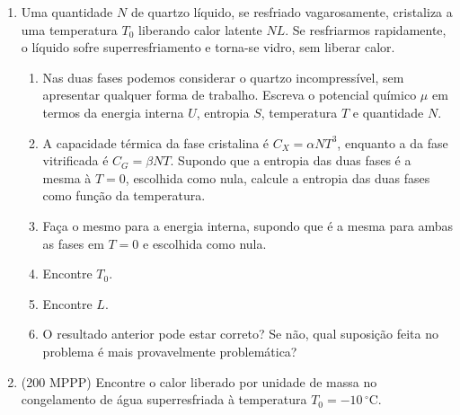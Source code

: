 \begin{enumerate}
    \item
        Uma quantidade $N$ de quartzo líquido, se resfriado vagarosamente,
        cristaliza a uma temperatura $T_0$ liberando calor latente $NL$. Se
        resfriarmos rapidamente, o líquido sofre superresfriamento e torna-se
        vidro, sem liberar calor.
        \begin{enumerate}
            \item
                Nas duas fases podemos considerar o quartzo incompressível, sem
                apresentar qualquer forma de trabalho. Escreva o potencial
                químico $\mu$ em termos da energia interna $U$, entropia $S$,
                temperatura $T$ e quantidade $N$.
            \item 
                A capacidade térmica da fase cristalina é $C_X=\alpha NT^3$,
                enquanto a da fase vitrificada é $C_G=\beta NT$. Supondo que a
                entropia das duas fases é a mesma à $T=0$, escolhida como nula,
                calcule a entropia das duas fases como função da temperatura.
            \item
                Faça o mesmo para a energia interna, supondo que é a mesma para
                ambas as fases em $T=0$ e escolhida como nula.
            \item
                Encontre $T_0$.
            \item
                Encontre $L$.
            \item
                O resultado anterior pode estar correto? Se não, qual suposição
                feita no problema é mais provavelmente problemática?
        \end{enumerate}
    \item
        (200 MPPP) Encontre o calor liberado por unidade de massa no
        congelamento de água superresfriada à temperatura $T_0=-10\,\mathrm
        {^\circ C}$.
\end{enumerate}
